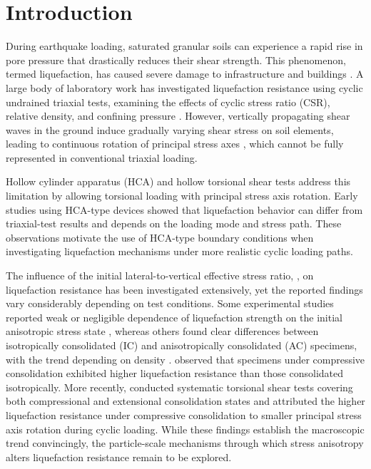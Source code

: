 \section{Introduction}
\label{sec:introduction}

During earthquake loading, saturated granular soils can experience a rapid rise in pore pressure that drastically reduces their shear strength. This phenomenon, termed liquefaction, has caused severe damage to infrastructure and buildings \citep{IshiharaKoga1981,SeedIdriss1967}. A large body of laboratory work has investigated liquefaction resistance using cyclic undrained triaxial tests, examining the effects of cyclic stress ratio (CSR), relative density, and confining pressure \citep{Hyodo1991,SeedLee1966,Silver1976,Toki1986}. However, vertically propagating shear waves in the ground induce gradually varying shear stress on soil elements, leading to continuous rotation of principal stress axes \citep{Arthur1980,IshiharaTowhata1983}, which cannot be fully represented in conventional triaxial loading.

Hollow cylinder apparatus (HCA) and hollow torsional shear tests address this limitation by allowing torsional loading with principal stress axis rotation. Early studies using HCA-type devices \citep[e.g.,][]{IshiharaYasuda1975,Tatsuoka1986,YamashitaToki1993} showed that liquefaction behavior can differ from triaxial-test results and depends on the loading mode and stress path. These observations motivate the use of HCA-type boundary conditions when investigating liquefaction mechanisms under more realistic cyclic loading paths.

The influence of the initial lateral-to-vertical effective stress ratio, \Kzero{}, on liquefaction resistance has been investigated extensively, yet the reported findings vary considerably depending on test conditions. Some experimental studies reported weak or negligible dependence of liquefaction strength on the initial anisotropic stress state \citep[e.g.,][]{IshiharaTakatsu1979,YamashitaToki1993}, whereas others found clear differences between isotropically consolidated (IC) and anisotropically consolidated (AC) specimens, with the trend depending on density \citep{GeorgiannouKonstadinou2014}. \citet{Vargas2020} observed that specimens under compressive consolidation exhibited higher liquefaction resistance than those consolidated isotropically. More recently, \citet{Zhao2024} conducted systematic torsional shear tests covering both compressional and extensional consolidation states and attributed the higher liquefaction resistance under compressive consolidation to smaller principal stress axis rotation during cyclic loading. While these findings establish the macroscopic trend convincingly, the particle-scale mechanisms through which stress anisotropy alters liquefaction resistance remain to be explored.

